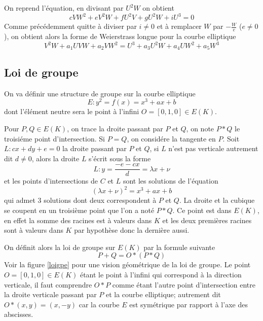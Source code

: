\documentclass{article}
\begin{document}
On reprend l'équation, en divisant par $U^2W$ on obtient
\begin{equation*}
cVW^2 + eV^2W + fU^2V + gU^2W + iU^3 = 0
\end{equation*}
Comme précédemment quitte à diviser par $i\neq 0$ et à remplacer $W$ par $-\frac{W}{e}$ ($e\neq 0$), on obtient
alors la forme de Weierstrass longue pour la courbe elliptique
\begin{equation*}
V^2W + a_{1}UVW + a_{2}VW^2 = U^3 + a_{3}U^2W + a_{4}UW^2 + a_{5}W^3
\end{equation*}

\subsection{Loi de groupe}
On va définir une structure de groupe sur la courbe elliptique
\begin{equation*}
E: y^{2} = f(x) = x^{3} + ax + b
\end{equation*}
dont
l'élément neutre sera le point à l'infini $O=[0,1,0]\in E(K)$.

Pour $P,Q\in E(K)$, on trace la droite passant par $P$ et $Q$, on note $P*Q$ le troisiéme point d'intersection.
Si $P=Q$, on considére la tangente en $P$.
Soit $L: cx+dy+e=0$ la droite passant par $P$ et $Q$, si $L$ n'est pas verticale autrement dit $d\neq 0$, alors
la droite $L$ s'écrit sous la forme
\begin{equation*}
L: y=\frac{-e-cx}{d}=\lambda x + \nu
\end{equation*}
et les points d'intersections de $C$ et $L$ sont les solutions de l'équation
\begin{equation*}
(\lambda x + \nu)^2 = x^3 + ax + b
\end{equation*}
qui admet 3 solutions dont deux correspondent à $P$ et $Q$. La droite et la cubique se coupent en un troisième
point que l'on a noté $P*Q$. Ce point est dans $E(K)$, en effet la somme des racines est à valeurs dans $K$ et les
deux premières racines sont à valeurs dans $K$ par hypothèse donc la dernière aussi.

On définit alors la loi de groupe sur $E(K)$ par la formule suivante
\begin{equation*}
P+Q = O*(P*Q)
\end{equation*}
Voir la figure \ref{loigpe} pour une vision géométrique de la loi de groupe.
Le point $O=[0,1,0]\in E(K)$ étant le point à
l'infini qui correspond à la direction verticale, il faut comprendre $O*P$ comme étant l'autre point
d'intersection entre la droite verticale passant par $P$ et la courbe elliptique; autrement dit $O*(x,y)=(x,-y)$
car la courbe $E$ est symétrique par rapport à l'axe des abscisses.
\end{document}
